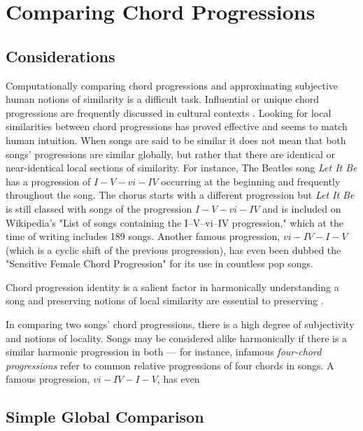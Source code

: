 \section{Comparing Chord Progressions}

\subsection{Considerations}

Computationally comparing chord progressions and approximating subjective human notions of similarity is a difficult task. Influential or unique chord progressions are frequently discussed in cultural contexts \cite{ogihara2008n}. Looking for local similarities between chord progressions has proved effective \cite{hanna2009alignment} and seems to match human intuition. When songs are said to be similar it does not mean that both songs' progressions are similar globally, but rather that there are identical or near-identical local sections of similarity. For instance, The Beatles song \textit{Let It Be} has a progression of $I - V - vi - IV$ occurring at the beginning and frequently throughout the song. The chorus starts with a different progression but \textit{Let It Be} is still classed with songs of the progression $I - V - vi - IV$ and is included on Wikipedia's "List of songs containing the I–V–vi–IV progression," which at the time of writing includes 189 songs\cite{wikiprog1}. Another famous progression, $vi-IV-I-V$ (which is a cyclic shift of the previous progression), has even been dubbed the "Sensitive Female Chord Progression" for its use in countless pop songs\cite{hirsh2008}.



Chord progression identity is a salient factor in harmonically understanding a song and preserving notions of local similarity are essential to preserving . 

In comparing two songs' chord progressions, there is a high degree of subjectivity and notions of locality. Songs may be considered alike harmonically if there is a similar harmonic progression in both --- for instance, infamous \textit{four-chord progressions} refer to common relative progressions of four chords in songs. A famous progression, $vi-IV-I-V$, has even 

\subsection{Simple Global Comparison}

